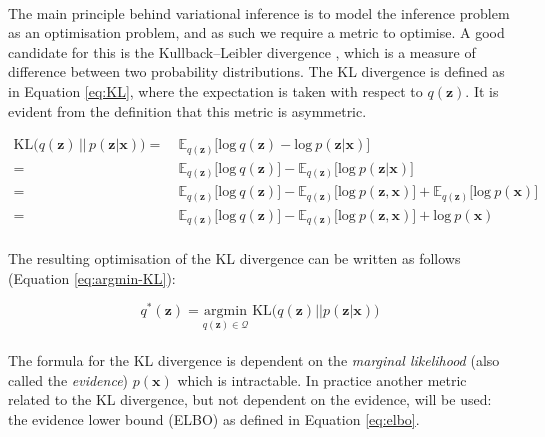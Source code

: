 \paragraph{}
{
    The main principle behind variational inference is to model the inference problem as an optimisation problem, and as such we require a metric to optimise. A good candidate for this is the Kullback–Leibler divergence \parencite{KL}, which is a measure of difference between two probability distributions. The KL divergence is defined as in Equation \ref{eq:KL}, where the expectation is taken with respect to $q(\bm{z})$. It is evident from the definition that this metric is asymmetric.
    
    \begin{equation}
        \label{eq:KL}
            \begin{split}
            \mathrm{KL} \big( q(\bm{z})\, ||\, p(\bm{z}|\bm{x}) \big) 
            = & \  
            \mathbb{E}_{q(\bm{z})} \big[ \mathrm{log} \: q(\bm{z}) - 
            \mathrm{log} \: p(\bm{z}|\bm{x}) \big] \\
            = & \ 
            \mathbb{E}_{q(\bm{z})} \big[ \mathrm{log} \: q(\bm{z}) \big] - 
            \mathbb{E}_{q(\bm{z})} \big[ \mathrm{log} \: p(\bm{z}|\bm{x}) \big] \\
            = & \
            \mathbb{E}_{q(\bm{z})} \big[ \mathrm{log} \: q(\bm{z}) \big] - 
            \mathbb{E}_{q(\bm{z})} \big[ \mathrm{log} \: p(\bm{z},\bm{x}) \big] + 
            \mathbb{E}_{q(\bm{z})} \big[ \mathrm{log} \: p(\bm{x}) \big] \\
            = & \
            \mathbb{E}_{q(\bm{z})} \big[ \mathrm{log} \: q(\bm{z}) \big] - 
            \mathbb{E}_{q(\bm{z})} \big[ \mathrm{log} \: p(\bm{z},\bm{x}) \big] + 
            \mathrm{log} \: p(\bm{x})
        \end{split}
    \end{equation}
    \\
    The resulting optimisation of the KL divergence can be written as follows (Equation \ref{eq:argmin-KL}):
    
    \begin{equation}
        \label{eq:argmin-KL}
        q^*(\bm{z}) = \underset{q(\bm{z}) \in \mathcal{Q}} 
        {\mathrm{argmin}} \; \mathrm{KL} \big( q(\bm{z})||p(\bm{z}|\bm{x}) \big)
    \end{equation}
    \\
    The formula for the KL divergence is dependent on the \textit{marginal likelihood} (also called the \textit{evidence}) $p(\bm{x})$ which is intractable. In practice another metric related to the KL divergence, but not dependent on the evidence, will be used: the evidence lower bound (ELBO) as defined in Equation \ref{eq:elbo}.
    \\
    
}
